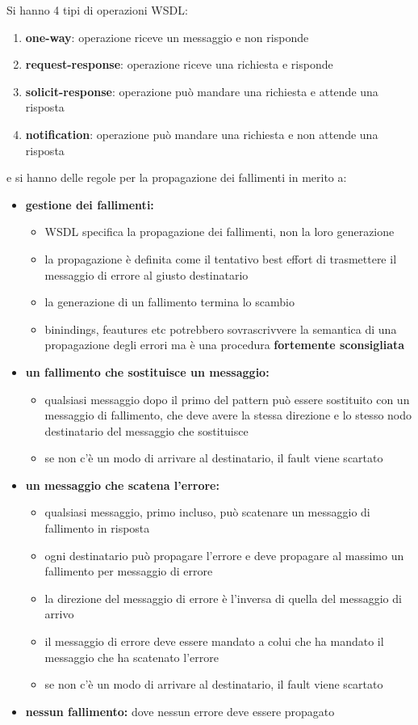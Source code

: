 \documentclass[a4paper,12pt, oneside]{book}
\begin{document}
Si hanno 4 tipi di operazioni WSDL:
\begin{enumerate}
\item \textbf{one-way}: operazione riceve un messaggio e non risponde
\item \textbf{request-response}: operazione riceve una richiesta e risponde
\item \textbf{solicit-response}: operazione può mandare una richiesta e attende una risposta
\item \textbf{notification}: operazione può mandare una richiesta e non attende una risposta
\end{enumerate}
e si hanno delle regole per la propagazione dei fallimenti in merito a:
\begin{itemize}
\item \textbf{gestione dei fallimenti:}
  \begin{itemize}
    \item WSDL specifica la propagazione dei fallimenti, non la loro generazione
    \item la propagazione è definita come il tentativo best effort di trasmettere il messaggio di errore al giusto destinatario
    \item la generazione di un fallimento termina lo scambio
    \item binindings, feautures etc potrebbero sovrascrivvere la semantica di una propagazione degli errori ma è una procedura \textbf{fortemente sconsigliata} 
  \end{itemize}
\item \textbf{un fallimento che sostituisce un messaggio:}
  \begin{itemize}
    \item qualsiasi messaggio dopo il primo del pattern può essere sostituito con un messaggio di fallimento, che deve avere la stessa
      direzione e lo stesso nodo destinatario del messaggio che sostituisce
    \item se non c'è un modo di arrivare al destinatario, il fault viene scartato
  \end{itemize}
\item \textbf{un messaggio che scatena l'errore:}
  \begin{itemize}
    \item qualsiasi messaggio, primo incluso, può scatenare un messaggio di fallimento in risposta
    \item ogni destinatario può propagare l'errore e deve propagare al massimo un fallimento per messaggio di errore
    \item la direzione del messaggio di errore è l'inversa di quella del messaggio di arrivo
    \item il messaggio di errore deve essere mandato a colui che ha mandato il messaggio che ha scatenato l'errore
    \item se non c'è un modo di arrivare al destinatario, il fault viene scartato
  \end{itemize}
\item \textbf{nessun fallimento:} dove nessun errore deve essere propagato
\end{itemize}
\end{document}
